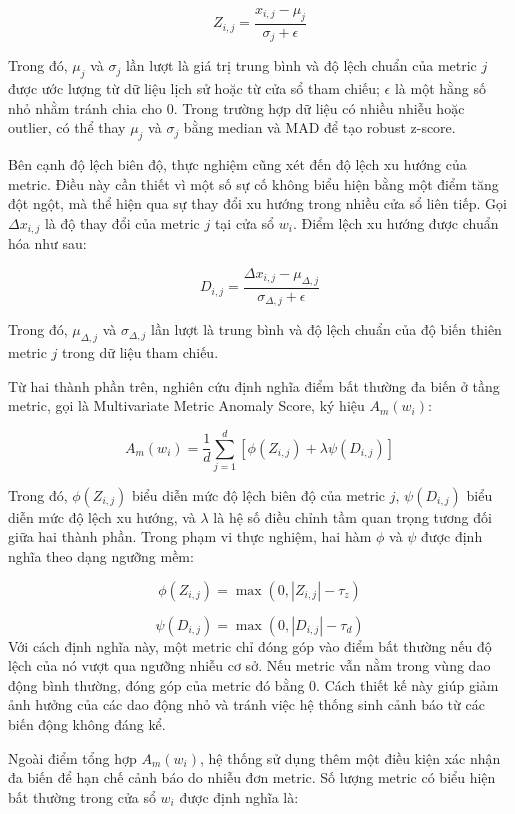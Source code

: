 \textbf{\[
Z_{i,j} = \frac{x_{i,j} - \mu_j}{\sigma_j + \epsilon}
\]}

Trong đó, \(\mu_j\) và \(\sigma_j\) lần lượt là giá trị trung bình và độ lệch chuẩn của metric \(j\) được ước lượng từ dữ liệu lịch sử hoặc từ cửa sổ tham chiếu; \(\epsilon\) là một hằng số nhỏ nhằm tránh chia cho 0. Trong trường hợp dữ liệu có nhiều nhiễu hoặc outlier, có thể thay \(\mu_j\) và \(\sigma_j\) bằng median và MAD để tạo robust z-score.

Bên cạnh độ lệch biên độ, thực nghiệm cũng xét đến độ lệch xu hướng của metric. Điều này cần thiết vì một số sự cố không biểu hiện bằng một điểm tăng đột ngột, mà thể hiện qua sự thay đổi xu hướng trong nhiều cửa sổ liên tiếp. Gọi \(\Delta x_{i,j}\) là độ thay đổi của metric \(j\) tại cửa sổ \(w_i\). Điểm lệch xu hướng được chuẩn hóa như sau:

\textbf{\[
D_{i,j} =
\frac{\Delta x_{i,j} - \mu_{\Delta,j}}
{\sigma_{\Delta,j} + \epsilon}
\]}

Trong đó, \(\mu_{\Delta,j}\) và \(\sigma_{\Delta,j}\) lần lượt là trung bình và độ lệch chuẩn của độ biến thiên metric \(j\) trong dữ liệu tham chiếu.

Từ hai thành phần trên, nghiên cứu định nghĩa điểm bất thường đa biến ở tầng metric, gọi là Multivariate Metric Anomaly Score, ký hiệu \(A_m(w_i)\):

\textbf{\[
A_m(w_i)=
\frac{1}{d}
\sum_{j=1}^{d}
\left[
\phi(Z_{i,j})
+
\lambda \psi(D_{i,j})
\right]
\]}

Trong đó, \(\phi(Z_{i,j})\) biểu diễn mức độ lệch biên độ của metric \(j\), \(\psi(D_{i,j})\) biểu diễn mức độ lệch xu hướng, và \(\lambda\) là hệ số điều chỉnh tầm quan trọng tương đối giữa hai thành phần. Trong phạm vi thực nghiệm, hai hàm \(\phi\) và \(\psi\) được định nghĩa theo dạng ngưỡng mềm:

\textbf{\[
\phi(Z_{i,j}) = \max(0, |Z_{i,j}| - \tau_z)
\]}

\textbf{\[
\psi(D_{i,j}) = \max(0, |D_{i,j}| - \tau_d)
\]
}
Với cách định nghĩa này, một metric chỉ đóng góp vào điểm bất thường nếu độ lệch của nó vượt qua ngưỡng nhiễu cơ sở. Nếu metric vẫn nằm trong vùng dao động bình thường, đóng góp của metric đó bằng 0. Cách thiết kế này giúp giảm ảnh hưởng của các dao động nhỏ và tránh việc hệ thống sinh cảnh báo từ các biến động không đáng kể.

Ngoài điểm tổng hợp \(A_m(w_i)\), hệ thống sử dụng thêm một điều kiện xác nhận đa biến để hạn chế cảnh báo do nhiễu đơn metric. Số lượng metric có biểu hiện bất thường trong cửa sổ \(w_i\) được định nghĩa là:

